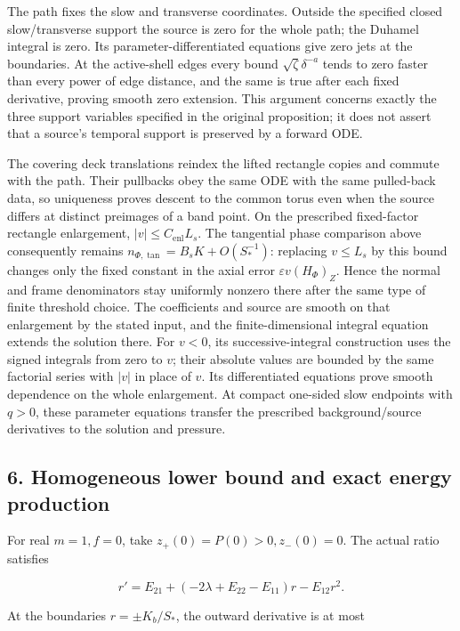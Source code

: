 \documentclass[10pt,a4paper]{article}
\begin{document}
The path fixes the slow and transverse coordinates. Outside the specified closed slow/transverse support the source is zero for the whole path; the Duhamel integral is zero. Its parameter-differentiated equations give zero jets at the boundaries. At the active-shell edges every bound \(\sqrt\zeta\delta^{-a}\) tends to zero faster than every power of edge distance, and the same is true after each fixed derivative, proving smooth zero extension. This argument concerns exactly the three support variables specified in the original proposition; it does not assert that a source's temporal support is preserved by a forward ODE.

The covering deck translations reindex the lifted rectangle copies and commute with the path. Their pullbacks obey the same ODE with the same pulled-back data, so uniqueness proves descent to the common torus even when the source differs at distinct preimages of a band point. On the prescribed fixed-factor rectangle enlargement, \(|v|\le C_{\mathrm{enl}}L_s\). The tangential phase comparison above consequently remains \(n_{\Phi,\tan}=B_sK+O(S_*^{-1})\): replacing \(v\le L_s\) by this bound changes only the fixed constant in the axial error \(\varepsilon v(H_\Phi)_Z\). Hence the normal and frame denominators stay uniformly nonzero there after the same type of finite threshold choice. The coefficients and source are smooth on that enlargement by the stated input, and the finite-dimensional integral equation extends the solution there. For \(v<0\), its successive-integral construction uses the signed integrals from zero to \(v\); their absolute values are bounded by the same factorial series with \(|v|\) in place of \(v\). Its differentiated equations prove smooth dependence on the whole enlargement. At compact one-sided slow endpoints with \(q>0\), these parameter equations transfer the prescribed background/source derivatives to the solution and pressure.

\subsection{6. Homogeneous lower bound and exact energy production}\label{gclosure:homogeneous-lower-bound-and-exact-energy-production}

For real \(m=1,f=0\), take \(z_+(0)=P(0)>0,z_-(0)=0\). The actual ratio satisfies

\[
r'=E_{21}+(-2\lambda+E_{22}-E_{11})r-E_{12}r^2.
\]

At the boundaries \(r=\pm K_b/S_*\), the outward derivative is at most
\end{document}

